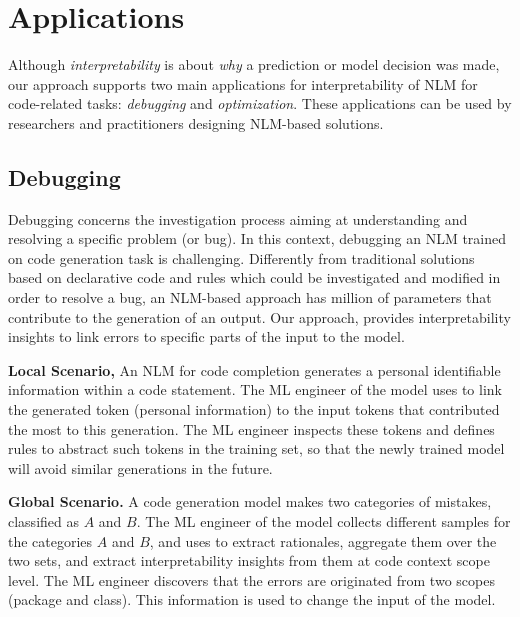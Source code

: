 \section{Applications}
\label{sec:applications-rationales}

Although \textit{interpretability} is about \textit{why} a prediction or model decision was made, our approach supports two main applications for interpretability of NLM for code-related tasks: \textit{debugging} and \textit{optimization}. These applications can be used by researchers and practitioners designing NLM-based solutions.

\subsection{Debugging}
Debugging concerns the investigation process aiming at understanding and resolving a specific problem (or bug). In this context, debugging an NLM trained on code generation task is challenging. Differently from traditional solutions based on declarative code and rules which could be investigated and modified in order to resolve a bug, an NLM-based approach has million of parameters that contribute to the generation of an output. Our approach, provides interpretability insights to link errors to specific parts of the input to the model.


\textbf{Local Scenario,} An NLM for code completion generates a personal identifiable information within a code statement. The ML engineer of the model uses \codeSeqRational to link the generated token (personal information) to the input tokens that contributed the most to this generation. The ML engineer inspects these tokens and defines rules to abstract such tokens in the training set, so that the newly trained model will avoid similar generations in the future. 


\textbf{Global Scenario.} A code generation model makes two categories of mistakes, classified as $A$ and $B$. The ML engineer of the model collects different samples for the categories  $A$ and $B$, and uses \codeSeqRational to extract rationales, aggregate them over the two sets, and extract interpretability insights from them at code context scope level. The ML engineer discovers that the errors are originated from two scopes (\eg package and class). This information is used to change the input of the model.


